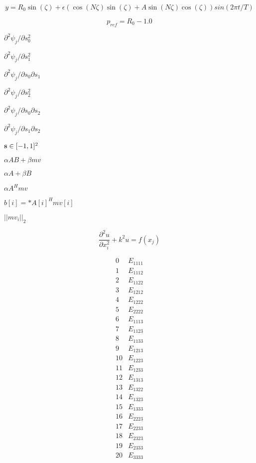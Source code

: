 \documentclass{article}
\begin{document}
\[ y = R_0 \sin(\zeta) + \epsilon \left( \cos(N \zeta) \sin(\zeta) + A \sin(N \zeta) \cos(\zeta) \right) sin(2 \pi t/T) \]
\pagebreak

\[ p_{ref} = R_0 - 1.0 \]
\pagebreak

$ \partial ^2 \psi_j / \partial s_0^2 $
\pagebreak

$ \partial ^2 \psi_j / \partial s_1^2 $
\pagebreak

$ \partial ^2 \psi_j / \partial s_0 \partial s_1 $
\pagebreak

$ \partial ^2 \psi_j / \partial s_2^2 $
\pagebreak

$ \partial ^2 \psi_j / \partial s_0 \partial s_2 $
\pagebreak

$ \partial ^2 \psi_j / \partial s_1 \partial s_2 $
\pagebreak

$ {\bf s} \in [-1,1]^2 $
\pagebreak

$ \alpha AB + \beta mv $
\pagebreak

$\alpha A + \beta B$
\pagebreak

$ \alpha A^Hmv $
\pagebreak

$ b[i] = * A[i]^Hmv[i] $
\pagebreak

$||mv_i||_2$
\pagebreak

\[ \frac{\partial^2 u}{\partial x_i^2} + k^2 u = f(x_j) \]
\pagebreak

\[\begin{array}{cc} 0 & E_{1111} \\ 1 & E_{1112} \\ 2 & E_{1122} \\ 3 & E_{1212} \\ 4 & E_{1222} \\ 5 & E_{2222} \\ 6 & E_{1113} \\ 7 & E_{1123} \\ 8 & E_{1133} \\ 9 & E_{1213} \\ 10 & E_{1223} \\ 11 & E_{1233} \\ 12 & E_{1313} \\ 13 & E_{1322} \\ 14 & E_{1323} \\ 15 & E_{1333} \\ 16 & E_{2223} \\ 17 & E_{2233} \\ 18 & E_{2323} \\ 19 & E_{2333} \\ 20 & E_{3333} \end{array}\]
\pagebreak
\end{document}
